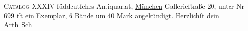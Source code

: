 \begin{ledgroupsized}[t]{13cm}
                  \textsc{Catalog XXXIV}{ }ſüddeutſches Antiquariat, \uline{München} Gallerieſtraße 20, unter Nr 699 iſt
               ein Exemplar, 6 Bände um 40 Mark angekündigt. Herzlichſt dein{\\}\spacefill\mbox{Arth Sch}\pend
           
         
         \endnumbering{}\end{ledgroupsized}  \newcommand{\dateiname}{L01339}\newcommand{\titel}{Arthur Schnitzler an Hermann Bahr, 10. 11. [1903]}\newcommand{\editorInnen}{ Kurt Ifkovits,  Martin Anton Müller}
      